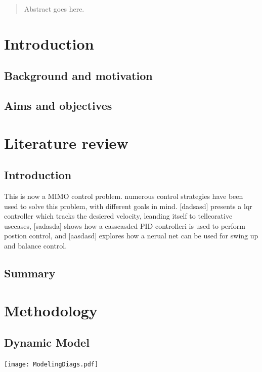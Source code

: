   \begin{abstract} %
    Abstract goes here.
  \end{abstract}%
  \clearpage
  \section{Introduction}
    \subsection{Background and motivation}
    \subsection{Aims and objectives}
  \section{Literature review} %

    \subsection{Introduction}

    This is now a MIMO control problem. numerous control strategies have been used to solve this problem, 
    with different goals in mind. [dadsasd] presents a lqr controller which tracks 
    the desiered velocity, leanding itself to telleorative usecases, [sadasda] 
    shows how a casscasded PID controlleri is used to perform postion control, 
    and [aasdasd] explores how a nerual net can be used for swing up and balance control.
    \subsection{Summary}
  \pagebreak{}
  \section{Methodology } %
  \subsection{Dynamic Model}
    \texttt{[image: ModelingDiags.pdf]}

